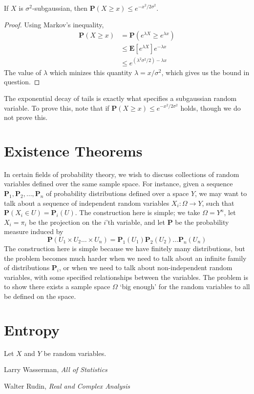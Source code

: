 \begin{theorem}
    If $X$ is $\sigma^2$-subgaussian, then $\mathbf{P}(X \geq x) \leq e^{-x^2/2\sigma^2}$.
\end{theorem}
\begin{proof}
    Using Markov's inequality,
    \begin{align*}
        \mathbf{P}(X \geq x) &= \mathbf{P}(e^{\lambda X} \geq e^{\lambda x})\\
        &\leq \mathbf{E}[e^{\lambda X}] e^{- \lambda x}\\
        &\leq e^{(\lambda^2 \sigma^2/2) - \lambda x}
    \end{align*}
    The value of $\lambda$ which minizes this quantity $\lambda = x/\sigma^2$, which gives us the bound in question.
\end{proof}

The exponential decay of tails is exactly what specifies a subgaussian random variable. To prove this, note that if $\mathbf{P}(X \geq x) \leq e^{-x^2/2\sigma^2}$ holds, though we do not prove this.

\chapter{Existence Theorems}

In certain fields of probability theory, we wish to discuss collections of random variables defined over the same sample space. For instance, given a sequence $\mathbf{P}_1, \mathbf{P}_2, \dots, \mathbf{P}_n$ of probability distributions defined over a space $Y$, we may want to talk about a sequence of independent random variables $X_i: \Omega \to Y$, such that $\mathbf{P}(X_i \in U) = \mathbf{P}_i(U)$. The construction here is simple; we take $\Omega = Y^n$, let $X_i = \pi_i$ be the projection on the $i$'th variable, and let $\mathbf{P}$ be the probability measure induced by
%
\[ \mathbf{P}(U_1 \times U_2 \dots \times U_n) = \mathbf{P}_1(U_1) \mathbf{P}_2(U_2) \dots \mathbf{P}_n(U_n) \]
%
The construction here is simple because we have finitely many distributions, but the problem becomes much harder when we need to talk about an infinite family of distributions $\mathbf{P}_i$, or when we need to talk about non-independent random variables, with some specified relationships between the variables. The problem is to show there exists a sample space $\Omega$ `big enough' for the random variables to all be defined on the space.

\chapter{Entropy}

Let $X$ and $Y$ be random variables.

\begin{thebibliography}{10}
     Larry Wasserman,
    \emph{All of Statistics}

     Walter Rudin,
    \emph{Real and Complex Analysis}
\end{thebibliography}

